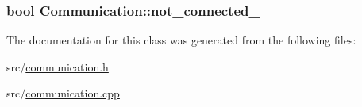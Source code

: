 \subsubsection[{not\+\_\+connected\+\_\+}]{\setlength{\rightskip}{0pt plus 5cm}bool Communication\+::not\+\_\+connected\+\_\+}\label{class_communication_a566d648baea3543f997db397e7467a75}


The documentation for this class was generated from the following files\+:\begin{DoxyCompactItemize}
\item 
src/\hyperlink{communication_8h}{communication.\+h}\item 
src/\hyperlink{communication_8cpp}{communication.\+cpp}\end{DoxyCompactItemize}
